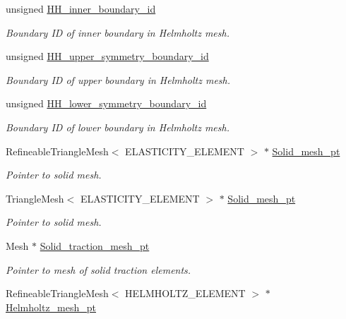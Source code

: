 \begin{DoxyCompactItemize}
unsigned \hyperlink{classCoatedSphereProblem_a2d8f60f068d2e9442a9f096843ffb098}{H\+H\+\_\+inner\+\_\+boundary\+\_\+id}
\begin{DoxyCompactList}\small\item\em Boundary ID of inner boundary in Helmholtz mesh. \end{DoxyCompactList}\item 
unsigned \hyperlink{classCoatedSphereProblem_a020701b863392278cc7e1dfb3ff8fc3b}{H\+H\+\_\+upper\+\_\+symmetry\+\_\+boundary\+\_\+id}
\begin{DoxyCompactList}\small\item\em Boundary ID of upper boundary in Helmholtz mesh. \end{DoxyCompactList}\item 
unsigned \hyperlink{classCoatedSphereProblem_a92c1c0e05c620f01d8b6851d952cfc19}{H\+H\+\_\+lower\+\_\+symmetry\+\_\+boundary\+\_\+id}
\begin{DoxyCompactList}\small\item\em Boundary ID of lower boundary in Helmholtz mesh. \end{DoxyCompactList}\item 
Refineable\+Triangle\+Mesh$<$ E\+L\+A\+S\+T\+I\+C\+I\+T\+Y\+\_\+\+E\+L\+E\+M\+E\+NT $>$ $\ast$ \hyperlink{classCoatedSphereProblem_a0239a4320d1a34e632a81599d908b648}{Solid\+\_\+mesh\+\_\+pt}
\begin{DoxyCompactList}\small\item\em Pointer to solid mesh. \end{DoxyCompactList}\item 
Triangle\+Mesh$<$ E\+L\+A\+S\+T\+I\+C\+I\+T\+Y\+\_\+\+E\+L\+E\+M\+E\+NT $>$ $\ast$ \hyperlink{classCoatedSphereProblem_a6a1c655fb048aee98669b78024b59e8e}{Solid\+\_\+mesh\+\_\+pt}
\begin{DoxyCompactList}\small\item\em Pointer to solid mesh. \end{DoxyCompactList}\item 
Mesh $\ast$ \hyperlink{classCoatedSphereProblem_aa51300e92727226f4b150eac2c62ddd7}{Solid\+\_\+traction\+\_\+mesh\+\_\+pt}
\begin{DoxyCompactList}\small\item\em Pointer to mesh of solid traction elements. \end{DoxyCompactList}\item 
Refineable\+Triangle\+Mesh$<$ H\+E\+L\+M\+H\+O\+L\+T\+Z\+\_\+\+E\+L\+E\+M\+E\+NT $>$ $\ast$ \hyperlink{classCoatedSphereProblem_a5f7a85c289bde4728679f8939f4283ad}{Helmholtz\+\_\+mesh\+\_\+pt}

\end{DoxyCompactItemize}
